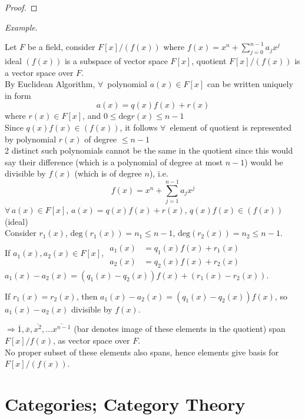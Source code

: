 \documentclass[10pt]{amsart}
\begin{document}
\begin{multicols*}{2}
\begin{proof}
\end{proof}


\emph{Example}. 

Let $F$ be a field, consider $F[x]/(f(x))$ where $f(x) = x^n + \sum_{j=0}^{n-1} a_j x^j$ \\
ideal $(f(x))$ is a subspace of vector space $F[x]$, quotient $F[x]/(f(x))$ is a vector space over $F$. \\

By Euclidean Algorithm, $\forall \, $ polynomial $a(x) \in F[x]$ can be written uniquely in form
\[
a(x) = q(x) f(x) + r(x)
\]
where $r(x) \in F[x]$, and $0\leq \text{deg}{r(x)} \leq n -1$ \\
Since $q(x) f(x) \in (f(x))$, it follows $\forall\, $ element of quotient is represented by polynomial $r(x)$ of degree $\leq n - 1$ \\
2 distinct such polynomials cannot be the same in the quotient since this would say their difference (which is a polynomial of degree at most $n-1$) would be divisible by $f(x)$ (which is of degree $n$), i.e. 
\[
f(x) = x^n + \sum_{j=1}^{n-1} a_j x^j
\]
$\forall \, a(x) \in F[x]$, $a(x) = q(x) f(x) + r(x)$, $q(x) f(x) \in (f(x))$ (ideal) \\

Consider $r_1(x)$, $\text{deg}(r_1(x)) = n_1 \leq n -1$, $\text{deg}(r_2(x)) = n_2 \leq n -1$. \\
If $a_1(x), a_2(x) \in F[x]$, $\begin{aligned} 
& \quad \\ 
a_1(x) & = q_1(x) f(x) + r_1(x) \\ 
a_2(x) & = q_2(x) f(x) + r_2(x) \end{aligned}$  $a_1(x) - a_2(x) = (q_1(x) - q_2(x)) f(x) + (r_1(x) - r_2(x))$.

If $r_1(x) = r_2(x)$, then $a_1(x) - a_2(x) = (q_1(x) - q_2(x)) f(x)$, so $a_1(x) - a_2(x)$ divisible by $f(x)$.

$\Longrightarrow \overline{1}, \overline{x}, \overline{x^2} , \dots \overline{x^{n-1}}$ (bar denotes image of these elements in the quotient) span $F[x]/f(x)$, as vector space over $F$. \\
No proper subset of these elements also spans, hence elements give basis for $F[x]/(f(x))$.





\section{Categories; Category Theory}  


\end{multicols*}
\end{document}

